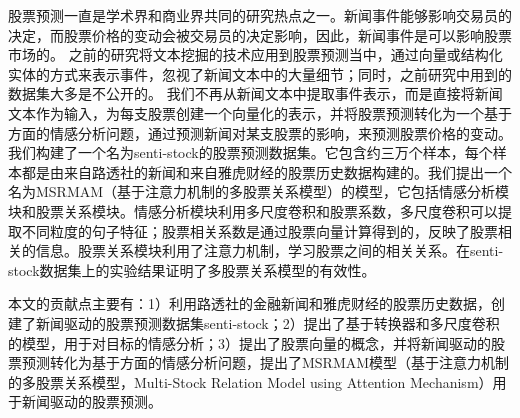\begin{cabstract}
股票预测一直是学术界和商业界共同的研究热点之一。新闻事件能够影响交易员的决定，而股票价格的变动会被交易员的决定影响，因此，新闻事件是可以影响股票市场的。
之前的研究将文本挖掘的技术应用到股票预测当中，通过向量或结构化实体的方式来表示事件，忽视了新闻文本中的大量细节；同时，之前研究中用到的数据集大多是不公开的。
我们不再从新闻文本中提取事件表示，而是直接将新闻文本作为输入，为每支股票创建一个向量化的表示，并将股票预测转化为一个基于方面的情感分析问题，通过预测新闻对某支股票的影响，来预测股票价格的变动。我们构建了一个名为senti-stock的股票预测数据集。它包含约三万个样本，每个样本都是由来自路透社的新闻和来自雅虎财经的股票历史数据构建的。我们提出一个名为MSRMAM（基于注意力机制的多股票关系模型）的模型，它包括情感分析模块和股票关系模块。情感分析模块利用多尺度卷积和股票系数，多尺度卷积可以提取不同粒度的句子特征；股票相关系数是通过股票向量计算得到的，反映了股票相关的信息。股票关系模块利用了注意力机制，学习股票之间的相关关系。在senti-stock数据集上的实验结果证明了多股票关系模型的有效性。

本文的贡献点主要有：1）利用路透社的金融新闻和雅虎财经的股票历史数据，创建了新闻驱动的股票预测数据集senti-stock；2）提出了基于转换器和多尺度卷积的模型，用于对目标的情感分析；3）提出了股票向量的概念，并将新闻驱动的股票预测转化为基于方面的情感分析问题，提出了MSRMAM模型（基于注意力机制的多股票关系模型，Multi-Stock Relation Model using Attention Mechanism）用于新闻驱动的股票预测。


\end{cabstract}



